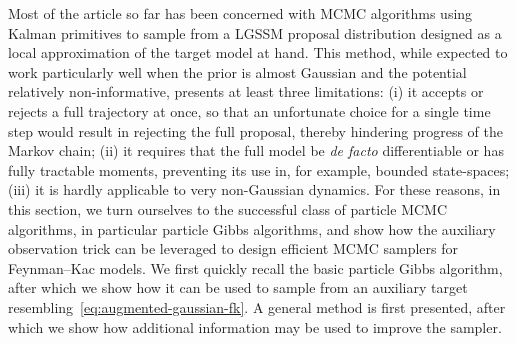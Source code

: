 Most of the article so far has been concerned with MCMC algorithms using Kalman primitives to sample from a LGSSM proposal distribution designed as a local approximation of the target model at hand. This method, while expected to work particularly well when the prior is almost Gaussian and the potential relatively non-informative, presents at least three limitations: (i) it accepts or rejects a full trajectory at once, so that an unfortunate choice for a single time step would result in rejecting the full proposal, thereby hindering progress of the Markov chain; (ii) it requires that the full model be \emph{de facto} differentiable or has fully tractable moments, preventing its use in, for example, bounded state-spaces; (iii) it is hardly applicable to very non-Gaussian dynamics.
For these reasons, in this section, we turn ourselves to the successful class of particle MCMC algorithms, in particular particle Gibbs algorithms, and show how the auxiliary observation trick can be leveraged to design efficient MCMC samplers for Feynman--Kac models.
We first quickly recall the basic particle Gibbs algorithm, after which we show how it can be used to sample from an auxiliary target resembling~\eqref{eq:augmented-gaussian-fk}. A general method is first presented, after which we show how additional information may be used to improve the sampler.